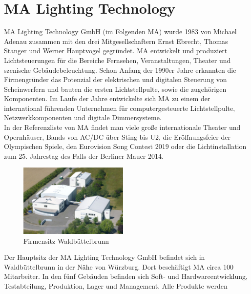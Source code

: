 \documentclass[11pt]{scrartcl}
\begin{document}
\section{MA Lighting Technology}
MA Lighting Technology GmbH (im Folgenden MA) wurde 1983 von Michael Adenau zusammen mit
den drei Mitgesellschaftern Ernst Ebrecht, Thomas Stanger und Werner Hauptvogel gegründet. MA
entwickelt und produziert Lichtsteuerungen für die Bereiche Fernsehen, Veranstaltungen, Theater
und szenische Gebäudebeleuchtung. Schon Anfang der 1990er Jahre erkannten die Firmengründer
das Potenzial der elektrischen und digitalen Steuerung von Scheinwerfern und bauten die ersten
Lichtstellpulte, sowie die zugehörigen Komponenten. Im Laufe der Jahre entwickelte sich MA zu
einem der international führenden Unternehmen für computergesteuerte Lichtstellpulte,
Netzwerkkomponenten und digitale Dimmersysteme.\\
In der Referenzliste von MA findet man viele große internationale Theater und Opernhäuser, Bands
von AC/DC über Sting bis U2, die Eröffnungsfeier der Olympischen Spiele, den Eurovision Song
Contest 2019 oder die Lichtinstallation zum 25. Jahrestag des Falls der Berliner Mauer 2014.\\
\begin{figure}
    \vspace{-25pt}
    \begin{center}
        \includegraphics[width=0.48\textwidth]{images/csm_MA_building_WBB.jpg}
    \end{center}
    \vspace{-20pt}
    \caption{Firmensitz Waldbüttelbrunn \cite{maabout}}
    \vspace{-15pt}
\end{figure}
Der Hauptsitz der MA Lighting Technology GmbH befindet sich in Waldbüttelbrunn in der Nähe von
Würzburg. Dort beschäftigt MA circa 100 Mitarbeiter. In den fünf Gebäuden befinden sich Soft- und
Hardwareentwicklung, Testabteilung, Produktion, Lager und Management. Alle Produkte werden
\end{document}
